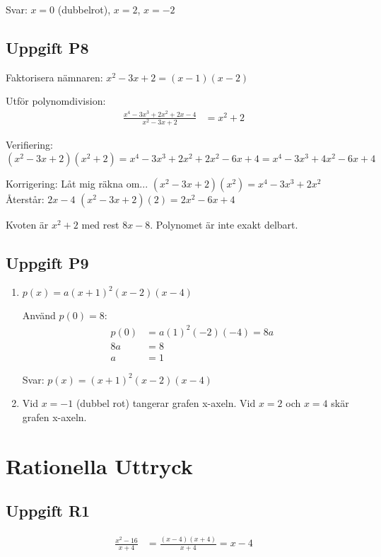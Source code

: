 \documentclass[12pt]{article}
\begin{document}
Svar: $x = 0$ (dubbelrot), $x = 2$, $x = -2$

\subsection*{Uppgift P8}
Faktorisera nämnaren: $x^2 - 3x + 2 = (x - 1)(x - 2)$

Utför polynomdivision:
\begin{align*}
\frac{x^4 - 3x^3 + 2x^2 + 2x - 4}{x^2 - 3x + 2} &= x^2 + 2
\end{align*}

Verifiering: $(x^2 - 3x + 2)(x^2 + 2) = x^4 - 3x^3 + 2x^2 + 2x^2 - 6x + 4 = x^4 - 3x^3 + 4x^2 - 6x + 4$

Korrigering: Låt mig räkna om...
$(x^2 - 3x + 2)(x^2) = x^4 - 3x^3 + 2x^2$
Återstår: $2x - 4$
$(x^2 - 3x + 2)(2) = 2x^2 - 6x + 4$

Kvoten är $x^2 + 2$ med rest $8x - 8$. Polynomet är inte exakt delbart.

\subsection*{Uppgift P9}
\begin{enumerate}[label=\alph*)]
    \item $p(x) = a(x + 1)^2(x - 2)(x - 4)$
    
    Använd $p(0) = 8$:
    \begin{align*}
    p(0) &= a(1)^2(-2)(-4) = 8a \\
    8a &= 8 \\
    a &= 1
    \end{align*}
    
    Svar: $p(x) = (x + 1)^2(x - 2)(x - 4)$
    
    \item Vid $x = -1$ (dubbel rot) tangerar grafen x-axeln. Vid $x = 2$ och $x = 4$ skär grafen x-axeln.
\end{enumerate}

\newpage

\section{Rationella Uttryck}

\subsection*{Uppgift R1}
\begin{align*}
\frac{x^2 - 16}{x + 4} &= \frac{(x - 4)(x + 4)}{x + 4} = x - 4
\end{align*}
\end{document}
